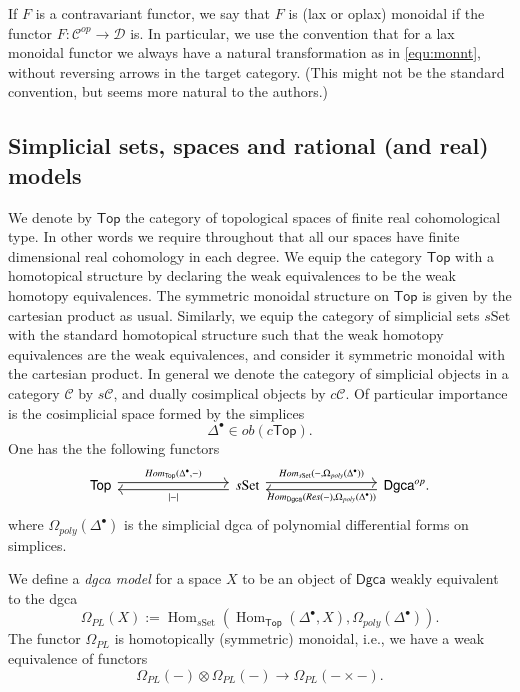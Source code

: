 \documentclass[a4paper]{amsart}
\theoremstyle{plain}
\theoremstyle{definition}
\newcommand{\Hom}{\mathop{Hom}}
\newcommand{\dgca}{\mathsf{Dgca}}
\newcommand{\mC}{{\mathcal{C}}}
\newcommand{\mD}{{\mathcal{D}}}
\renewcommand{\Top}{\mathsf{Top}}
\begin{document}
If $F$ is a contravariant functor, we say that $F$ is (lax or oplax) monoidal if the functor $F:\mC^{op}\to \mD$ is.
In particular, we use the convention that for a lax monoidal functor we always have a natural transformation as in \eqref{equ:monnt}, without reversing arrows in the target category.
(This might not be the standard convention, but seems more natural to the authors.)

\newcommand{\Set}{\mathrm{Set}}
\newcommand{\sSet}{s\Set}
\newcommand{\ob}{\mathit{ob}}
\newcommand{\Res}{\mathit{Res}}

\subsection{Simplicial sets, spaces and rational (and real) models}
We denote by $\Top$ the category of topological spaces of finite real cohomological type.
In other words we require throughout that all our spaces have finite dimensional real cohomology in each degree.
We equip the category $\Top$ with a homotopical structure by declaring the weak equivalences to be the weak homotopy equivalences.
The symmetric monoidal structure on $\Top$ is given by the cartesian product as usual.
Similarly, we equip the category of simplicial sets $\sSet$ with the standard homotopical structure such that the weak homotopy equivalences are the weak equivalences, and consider it symmetric monoidal with the cartesian product.
In general we denote the category of simplicial objects in a category $\mC$ by $s\mC$, and dually cosimplical objects by $c\mC$.
Of particular importance is the cosimplicial space formed by the simplices
\[
 \Delta^\bullet \in \ob (c\Top).
\]
One has the the following functors %
\[
 \begin{tikzcd}[every arrow/.append style={shift left},column sep=8em]
  \Top \ar{r}{\Hom_{\Top}(\Delta^\bullet, -)} & \ar{l}{|-|} \sSet\ar{r}{\Hom_{\sSet}(-,  \Omega_{poly}(\Delta^\bullet)) }  & \ar{l}{\Hom_{\dgca}(\Res(-), \Omega_{poly}(\Delta^\bullet)) } \dgca^{op}.
 \end{tikzcd}
\]
where $\Omega_{poly}(\Delta^\bullet)$ is the simplicial dgca of polynomial differential forms on simplices.
 
We define a \emph{dgca model} for a space $X$ to be an object of $\dgca$ weakly equivalent to the dgca
\[
\Omega_{PL}(X) :=  \Hom_{\sSet}( \Hom_{\Top}(\Delta^\bullet, X), \Omega_{poly}(\Delta^\bullet)).
\]
The functor $\Omega_{PL}$ is homotopically (symmetric) monoidal, i.e., we have a weak equivalence of functors
\[
 \Omega_{PL}(-)\otimes \Omega_{PL}(-) \to \Omega_{PL}(-\times -).
\]
\end{document}

